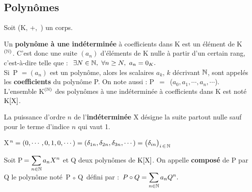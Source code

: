 \vspace{1cm}

\subsection{Polynômes}

\vspace{0.5cm}

\begin{center}
    Soit (K, +,\ \x) un corps.
\end{center}

\vspace{0.5cm}

\noindent Un \textbf{polynôme à une indéterminée} à coefficients dans K est un élément de K\(^{(\mathbb{N})}\). C'est donc une suite \((a_n)\) d'éléments de K nulle à partir d'un certain rang,\\
c'est-à-dire telle que : \(\ \exists N\in \NN,\ \forall n\geq N,\ a_n = 0_K. \)\vspace{0.1cm}\\
Si\, P\,\(\,=(a_n)\) est un polynôme, alors les scalaires \(a_k\), \(k\) décrivant \(\mathbb{N}\), sont appelés les \textbf{coefficients} du polynôme P. On note aussi : P $\,=\,$ (\(a_0,a_1,\cdots,a_n,\cdots\)).\\
L'ensemble K\(^{(\mathbb{N})}\) des polynômes à une indéterminée à coefficients dans K est noté $\text{K}[\text{X}]$. 

\vspace{1.3cm}

La puissance d'ordre $n$ de l'\textbf{indéterminée} X désigne la suite partout nulle sauf pour le terme d'indice $n$ qui vaut 1.\vspace{0.1cm}

\hspace{1.5cm}X\(^n=(0,\cdots,0,1,0,\cdots)=(\delta_{1n},\delta_{2n},\delta_{3n},\cdots)=\bigl(\delta_{in}\bigr)_{i\,\in\, \mathbb{N}}\)

\vspace{1.3cm}

\noindent Soit P\(\:=\displaystyle \sum _{n\in \mathbb{N}}a_nX^n\) et Q deux polynômes de $\text{K}[\text{X}]$. On appelle \textbf{composé} de P par Q le polynôme noté\, P\(\,\circ\,\)Q\, défini par : \(\,\displaystyle P\circ Q=\sum_{n\in \mathbb{N}}a_nQ^n.\)

\vspace{1.5cm}

